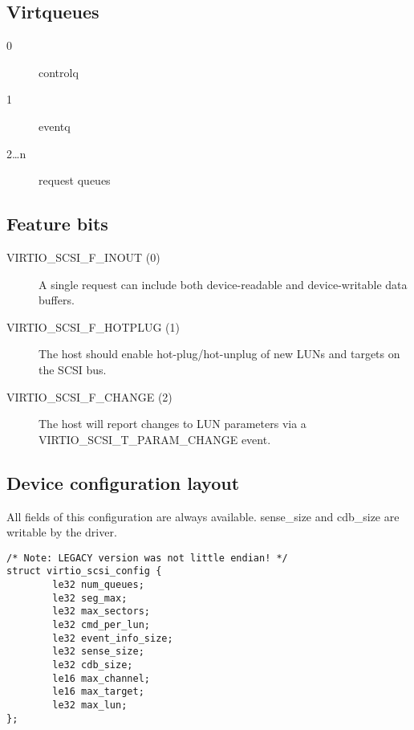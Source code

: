 \subsection{Virtqueues}\label{sec:Device Types / SCSI Host Device / Virtqueues}

\begin{description}
\item[0] controlq
\item[1] eventq
\item[2\ldots n] request queues
\end{description}

\subsection{Feature bits}\label{sec:Device Types / SCSI Host Device / Feature bits}

\begin{description}
\item[VIRTIO_SCSI_F_INOUT (0)] A single request can include both
    device-readable and device-writable data buffers.

\item[VIRTIO_SCSI_F_HOTPLUG (1)] The host should enable
    hot-plug/hot-unplug of new LUNs and targets on the SCSI bus.

\item[VIRTIO_SCSI_F_CHANGE (2)] The host will report changes to LUN
    parameters via a VIRTIO_SCSI_T_PARAM_CHANGE event.
\end{description}

\subsection{Device configuration layout}\label{sec:Device Types / SCSI Host Device / Device configuration layout}

  All fields of this configuration are always available. sense_size
  and cdb_size are writable by the driver.

\begin{lstlisting}
/* Note: LEGACY version was not little endian! */
struct virtio_scsi_config {
        le32 num_queues;
        le32 seg_max;
        le32 max_sectors;
        le32 cmd_per_lun;
        le32 event_info_size;
        le32 sense_size;
        le32 cdb_size;
        le16 max_channel;
        le16 max_target;
        le32 max_lun;
};
\end{lstlisting}

